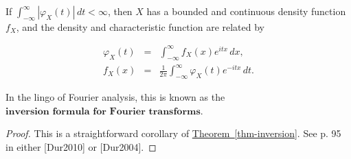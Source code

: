 \begin{thm}
If
$\int_{-\infty}^\infty |\varphi_X(t)|\,dt < \infty$,
then $X$ has a bounded and continuous density
function $f_X$, and the density and characteristic
function are related by

\begin{eqnarray*}
\varphi_X(t) &=& \int_{-\infty}^\infty f_X(x) e^{itx}\,dx,  \\
f_X(x) &=& \frac{1}{2\pi} \int_{-\infty}^\infty \varphi_X(t) e^{-itx}\,dt.
\end{eqnarray*}

\end{thm}

\noindent In the lingo of Fourier analysis, this is known as
the
$\textbf{inversion formula for Fourier transforms}$.

\begin{proof}
This is a straightforward corollary of \texorpdfstring{\hyperref[thm-inversion]{Theorem~\ref*{thm-inversion}}}{Theorem}. See p. 95 in either [Dur2010] or
[Dur2004].
\end{proof}
